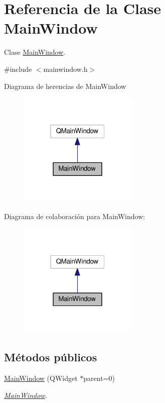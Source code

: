 \hypertarget{class_main_window}{}\section{Referencia de la Clase Main\+Window}
\label{class_main_window}


Clase \hyperlink{class_main_window}{Main\+Window}.  




{\ttfamily \#include $<$mainwindow.\+h$>$}



Diagrama de herencias de Main\+Window\nopagebreak
\begin{figure}[H]
\begin{center}
\leavevmode
\includegraphics[width=160pt]{class_main_window__inherit__graph}
\end{center}
\end{figure}


Diagrama de colaboración para Main\+Window\+:\nopagebreak
\begin{figure}[H]
\begin{center}
\leavevmode
\includegraphics[width=160pt]{class_main_window__coll__graph}
\end{center}
\end{figure}
\subsection*{Métodos públicos}
\begin{DoxyCompactItemize}
\item 
\hyperlink{class_main_window_a8b244be8b7b7db1b08de2a2acb9409db}{Main\+Window} (Q\+Widget $\ast$parent=0)
\begin{DoxyCompactList}\small\item\em \hyperlink{class_main_window}{Main\+Window}. \end{DoxyCompactList}\end{DoxyCompactItemize}
